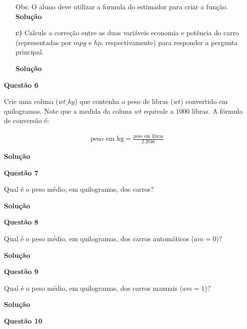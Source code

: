 \documentclass[12pt, a4paper]{article}
\begin{document}
\begin{itemize}
	Obs: O aluno deve utilizar a formula do estimador para criar a função.
	\textbf{Solução}
	
	
	
	
	
	\item[\textbf{c)}] Calcule a correção entre as duas variáveis economia e potência do carro (representadas por $mpg$ e $hp$, respectivamente) para responder a pergunta principal.

	\textbf{Solução}
	
	
	
	
	
\end{itemize}



\textbf{Questão 6}

Crie uma coluna ($wt\_kg$) que contenha o peso de libras ($wt$) convertido em quilogramas. Note que a medida da coluna $wt$ equivale a 1000 libras. A fórmula de conversão é:

\begin{align*}
	\text{peso em kg} = \frac{\text{peso em libras}}{2.2046}
\end{align*}

\textbf{Solução}





\textbf{Questão 7}

Qual é o peso médio, em quilogramas, dos carros?

\textbf{Solução}





\textbf{Questão 8}

Qual é o peso médio, em quilogramas, dos carros automáticos ($am = 0$)?

\textbf{Solução}





\textbf{Questão 9}

Qual é o peso médio, em quilogramas, dos carros manuais ($am = 1$)?

\textbf{Solução}





\textbf{Questão 10}
\end{document}
